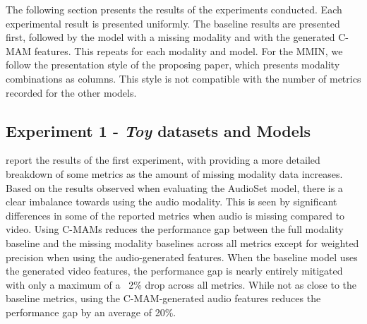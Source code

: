 The following section presents the results of the experiments conducted. Each experimental result is presented uniformly. The baseline results are presented first, followed by the model with a missing modality and with the generated C-MAM features. This repeats for each modality and model. For the MMIN, we follow the presentation style of the proposing paper, which presents modality combinations as columns. This style is not compatible with the number of metrics recorded for the other models. 


\subsection{Experiment 1 - \textit{Toy} datasets and Models}
 report the results of the first experiment, with  providing a more detailed breakdown of some metrics as the amount of missing modality data increases. Based on the results observed when evaluating the AudioSet model, there is a clear imbalance towards using the audio modality. This is seen by significant differences in some of the reported metrics when audio is missing compared to video. Using C-MAMs reduces the performance gap between the full modality baseline and the missing modality baselines across all metrics except for weighted precision when using the audio-generated features. When the baseline model uses the generated video features, the performance gap is nearly entirely mitigated with only a maximum of a ~2\% drop across all metrics. While not as close to the baseline metrics, using the C-MAM-generated audio features reduces the performance gap by an average of 20\%.


